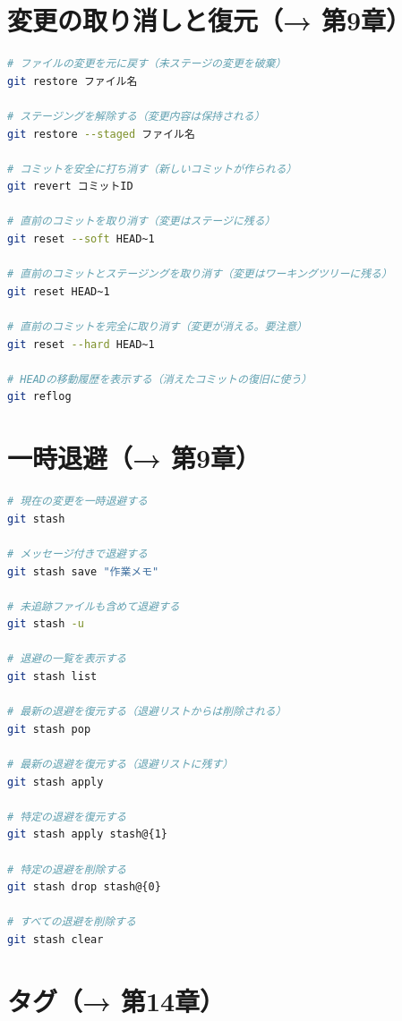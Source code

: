\section{変更の取り消しと復元（→ 第9章）}

\begin{lstlisting}[language=bash]
# ファイルの変更を元に戻す（未ステージの変更を破棄）
git restore ファイル名

# ステージングを解除する（変更内容は保持される）
git restore --staged ファイル名

# コミットを安全に打ち消す（新しいコミットが作られる）
git revert コミットID

# 直前のコミットを取り消す（変更はステージに残る）
git reset --soft HEAD~1

# 直前のコミットとステージングを取り消す（変更はワーキングツリーに残る）
git reset HEAD~1

# 直前のコミットを完全に取り消す（変更が消える。要注意）
git reset --hard HEAD~1

# HEADの移動履歴を表示する（消えたコミットの復旧に使う）
git reflog
\end{lstlisting}

\section{一時退避（→ 第9章）}

\begin{lstlisting}[language=bash]
# 現在の変更を一時退避する
git stash

# メッセージ付きで退避する
git stash save "作業メモ"

# 未追跡ファイルも含めて退避する
git stash -u

# 退避の一覧を表示する
git stash list

# 最新の退避を復元する（退避リストからは削除される）
git stash pop

# 最新の退避を復元する（退避リストに残す）
git stash apply

# 特定の退避を復元する
git stash apply stash@{1}

# 特定の退避を削除する
git stash drop stash@{0}

# すべての退避を削除する
git stash clear
\end{lstlisting}

\section{タグ（→ 第14章）}

